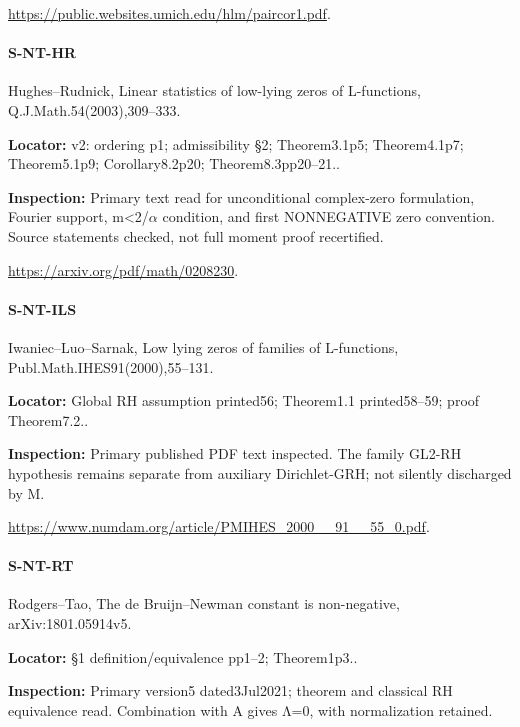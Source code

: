 \documentclass[11pt,a4paper]{article}
\begin{document}
\url{https://public.websites.umich.edu/hlm/paircor1.pdf}.

\paragraph{S-NT-HR} Hughes–\allowbreak{}Rudnick, Linear statistics of low-lying zeros of L-functions, Q.\allowbreak{}J.\allowbreak{}Math.\allowbreak{}54(2003),309–\allowbreak{}333.

\textbf{Locator:} v2:\allowbreak{} ordering p1; admissibility §2; Theorem3.\allowbreak{}1p5; Theorem4.\allowbreak{}1p7; Theorem5.\allowbreak{}1p9; Corollary8.\allowbreak{}2p20; Theorem8.\allowbreak{}3pp20–\allowbreak{}21.\allowbreak{}.

\textbf{Inspection:} Primary text read for unconditional complex-zero formulation, Fourier support, m<2/\allowbreak{}\ensuremath{\alpha} condition, and first NONNEGATIVE zero convention.\allowbreak{} Source statements checked, not full moment proof recertified.\allowbreak{}

\url{https://arxiv.org/pdf/math/0208230}.

\paragraph{S-NT-ILS} Iwaniec–\allowbreak{}Luo–\allowbreak{}Sarnak, Low lying zeros of families of L-functions, Publ.\allowbreak{}Math.\allowbreak{}IHES91(2000),55–\allowbreak{}131.

\textbf{Locator:} Global RH assumption printed56; Theorem1.\allowbreak{}1 printed58–\allowbreak{}59; proof Theorem7.\allowbreak{}2.\allowbreak{}.

\textbf{Inspection:} Primary published PDF text inspected.\allowbreak{} The family GL2-RH hypothesis remains separate from auxiliary Dirichlet-GRH; not silently discharged by M.\allowbreak{}

\url{https://www.numdam.org/article/PMIHES_2000__91__55_0.pdf}.

\paragraph{S-NT-RT} Rodgers–\allowbreak{}Tao, The de Bruijn–\allowbreak{}Newman constant is non-negative, arXiv:\allowbreak{}1801.\allowbreak{}05914v5.

\textbf{Locator:} §1 definition/\allowbreak{}equivalence pp1–\allowbreak{}2; Theorem1p3.\allowbreak{}.

\textbf{Inspection:} Primary version5 dated3Jul2021; theorem and classical RH equivalence read.\allowbreak{} Combination with A gives Λ=0, with normalization retained.\allowbreak{}
\end{document}
